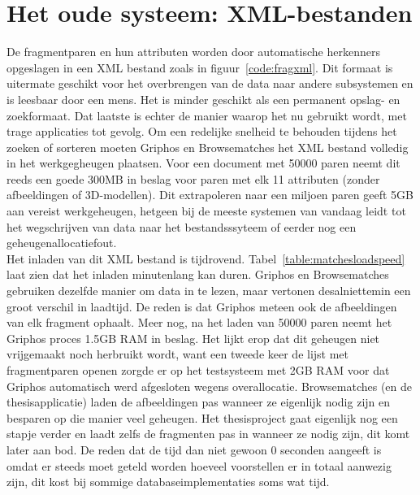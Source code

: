 \section{Het oude systeem: XML-bestanden}
De fragmentparen en hun attributen worden door automatische herkenners opgeslagen in een XML bestand zoals in figuur~\ref{code:fragxml}. Dit formaat is uitermate geschikt voor het overbrengen van de data naar andere subsystemen en is leesbaar door een mens. Het is minder geschikt als een permanent opslag- en zoekformaat. Dat laatste is echter de manier waarop het nu gebruikt wordt, met trage applicaties tot gevolg. Om een redelijke snelheid te behouden tijdens het zoeken of sorteren moeten Griphos en Browsematches het XML bestand volledig in het werkgegheugen plaatsen. Voor een document met 50000 paren neemt dit reeds een goede 300MB in beslag voor paren met elk 11 attributen (zonder afbeeldingen of 3D-modellen). Dit extrapoleren naar een miljoen paren geeft 5GB aan vereist werkgeheugen, hetgeen bij de meeste systemen van vandaag leidt tot het wegschrijven van data naar het bestandsssyteem of eerder nog een geheugenallocatiefout.\\

Het inladen van dit XML bestand is tijdrovend. Tabel~\ref{table:matchesloadspeed} laat zien dat het inladen minutenlang kan duren. Griphos en Browsematches gebruiken dezelfde manier om data in te lezen, maar vertonen desalniettemin een groot verschil in laadtijd. De reden is dat Griphos meteen ook de afbeeldingen van elk fragment ophaalt. Meer nog, na het laden van 50000 paren neemt het Griphos proces 1.5GB RAM in beslag. Het lijkt erop dat dit geheugen niet vrijgemaakt noch herbruikt wordt, want een tweede keer de lijst met fragmentparen openen zorgde er op het testsysteem met 2GB RAM voor dat Griphos automatisch werd afgesloten wegens overallocatie. Browsematches (en de thesisapplicatie) laden de afbeeldingen pas wanneer ze eigenlijk nodig zijn en besparen op die manier veel geheugen. Het thesisproject gaat eigenlijk nog een stapje verder en laadt zelfs de fragmenten pas in wanneer ze nodig zijn, dit komt later aan bod. De reden dat de tijd dan niet gewoon 0 seconden aangeeft is omdat er steeds moet geteld worden hoeveel voorstellen er in totaal aanwezig zijn, dit kost bij sommige databaseimplementaties soms wat tijd.

